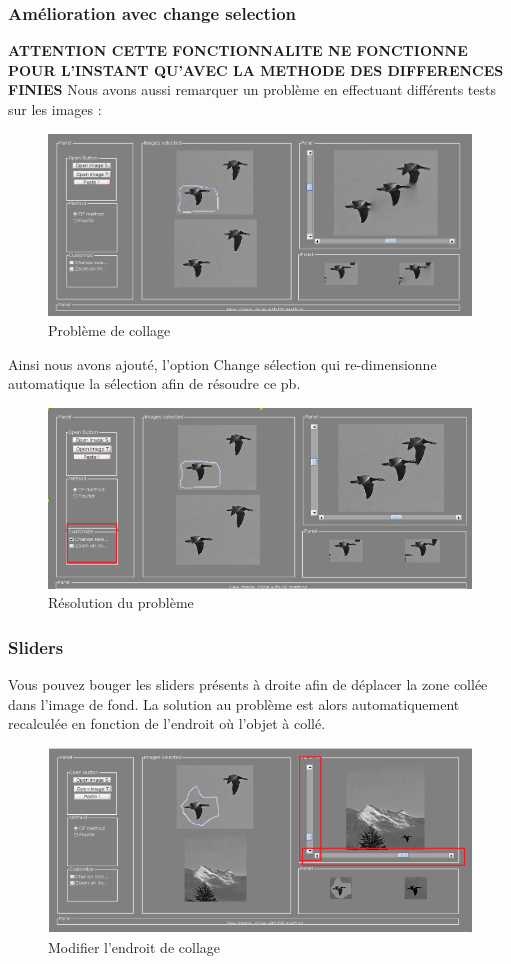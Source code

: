 \subsubsection{Amélioration avec change selection}
\textbf{ATTENTION CETTE FONCTIONNALITE NE FONCTIONNE POUR L'INSTANT QU'AVEC LA METHODE DES DIFFERENCES FINIES}
Nous avons aussi remarquer un problème en effectuant différents tests sur les images : 
\begin{figure}[!ht]
    \centering
    \includegraphics[scale = 0.15]{Images/pb.png}
    \caption{Problème de collage}
\end{figure}{}
Ainsi nous avons ajouté, l'option Change sélection qui re-dimensionne automatique la sélection afin de résoudre ce pb. 
\begin{figure}[!ht]
    \centering
    \includegraphics[scale = 0.3]{Images/solve.png}
    \caption{Résolution du problème}
\end{figure}{}

\subsubsection{Sliders}
Vous pouvez bouger les sliders présents à droite afin de déplacer la zone collée dans l'image de fond. La solution au problème est alors automatiquement recalculée en fonction de l'endroit où l'objet à collé. 
\begin{figure}[!h]
    \centering
    \includegraphics[scale = 0.2]{Images/move.png}
    \caption{Modifier l'endroit de collage}
\end{figure}

